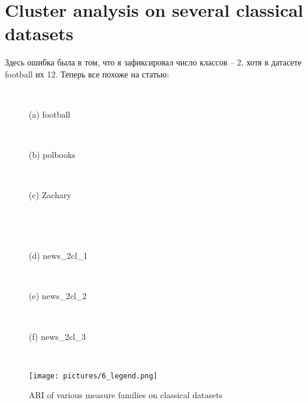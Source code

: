 \documentclass{article}
\begin{document}
\newpage
\section{Cluster analysis on several classical datasets}

Здесь ошибка была в том, что я зафиксировал число классов -- 2, хотя в датасете football их 12.
Теперь все похоже на статью:

\begin{figure}[H]
	\begin{minipage}{.32\textwidth}
		\\\centerline{(a) football}
	\end{minipage}
	\begin{minipage}{.32\textwidth}
		\\\centerline{(b) polbooks}
	\end{minipage}
	\begin{minipage}{.32\textwidth}
		\\\centerline{(c) Zachary}
	\end{minipage}
    \\[10pt]
	\begin{minipage}{.32\textwidth}
		\\\centerline{(d) news\_2cl\_1}
	\end{minipage}
	\begin{minipage}{.32\textwidth}
		\\\centerline{(e) news\_2cl\_2}
	\end{minipage}
	\begin{minipage}{.32\textwidth}
		\\\centerline{(f) news\_2cl\_3}
	\end{minipage}
	\\[10pt]
    \begin{minipage}{\textwidth}
        \hfill\texttt{[image: pictures/6\_legend.png]}\hfill
	\end{minipage}
  \caption{\label{f_datasets}ARI of various measure families on classical datasets}
\end{figure}
\end{document}
